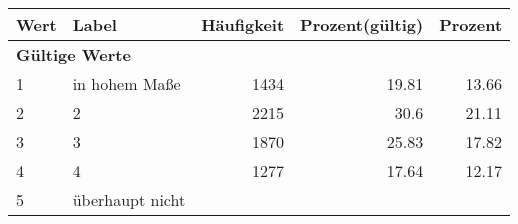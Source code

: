      \begin{longtable}{lXrrr}
     \toprule
     \textbf{Wert} & \textbf{Label} & \textbf{Häufigkeit} & \textbf{Prozent(gültig)} & \textbf{Prozent} \\
     \endhead
     \midrule
     \multicolumn{5}{l}{\textbf{Gültige Werte}}\\

     1 &
     \multicolumn{1}{X}{ in hohem Maße   } &


       \num{1434} &
       \num[round-mode=places,round-precision=2]{19.81} &
         \num[round-mode=places,round-precision=2]{13.66} \\

     2 &
     \multicolumn{1}{X}{ 2   } &


       \num{2215} &
       \num[round-mode=places,round-precision=2]{30.6} &
         \num[round-mode=places,round-precision=2]{21.11} \\

     3 &
     \multicolumn{1}{X}{ 3   } &


       \num{1870} &
       \num[round-mode=places,round-precision=2]{25.83} &
         \num[round-mode=places,round-precision=2]{17.82} \\

     4 &
     \multicolumn{1}{X}{ 4   } &


       \num{1277} &
       \num[round-mode=places,round-precision=2]{17.64} &
         \num[round-mode=places,round-precision=2]{12.17} \\

     5 &
     \multicolumn{1}{X}{ überhaupt nicht   } &



\end{longtable}
